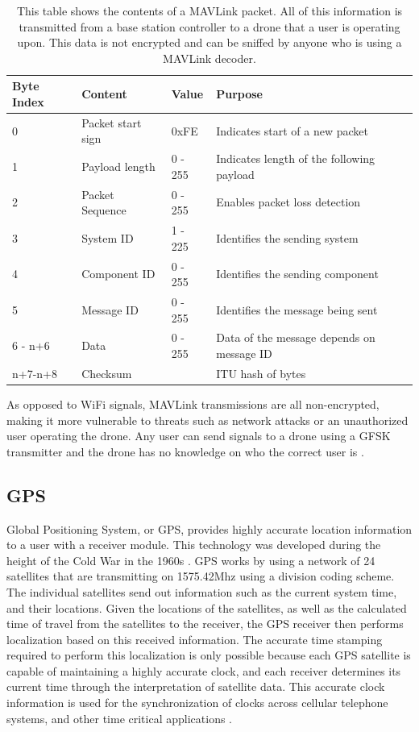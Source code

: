 \begin{table}[ht]
\centering
\caption{This table shows the contents of a MAVLink packet.  All of this information is transmitted from a base station controller to a drone that a user is operating upon.  This data is not encrypted and can be sniffed by anyone who is using a MAVLink decoder.}
\begin{tabular}{|l|l|l|p{7cm}|}
        \hline
        Byte Index & Content & Value &  Purpose \\ \hline
          0 &	Packet start sign &       0xFE &  Indicates start of a new packet\\
          1 &   Payload length &       0 - 255 &  Indicates length of the following payload \\
          2 &   Packet Sequence &      0 - 255 &  Enables packet loss detection \\
          3 &   System ID &            1 - 225 &  Identifies the sending system \\
          4 &   Component ID &         0 - 255 &  Identifies the sending component \\
          5 &	Message ID &		   0 - 255 &  Identifies the message being sent \\
          6 - n+6 &	Data & 			   0 - 255 & Data of the message depends on message ID \\
          n+7-n+8 & Checksum & & ITU hash of bytes \\
        \hline
\end{tabular}
\end{table}
\par
As opposed to WiFi signals, MAVLink transmissions are all non-encrypted, making it more vulnerable to threats such as network attacks or an unauthorized user operating the drone. Any user can send signals to a drone using a GFSK transmitter and the drone has no knowledge on who the correct user is \cite{mavlink_vuln}.

\subsection{GPS}
Global Positioning System, or GPS, provides highly accurate location information to a user with a receiver module. This technology was developed during the height of the Cold War in the 1960s \cite{gps_info}. GPS works by using a network of 24 satellites that are transmitting on 1575.42Mhz using a division coding scheme. The individual satellites send out information such as the current system time, and their locations. Given the locations of the satellites, as well as the calculated time of travel from the satellites to the receiver, the GPS receiver then performs localization based on this received information. The accurate time stamping required to perform this localization is only possible because each GPS satellite is capable of maintaining a highly accurate clock, and each receiver determines its current time through the interpretation of satellite data. This accurate clock information is used for the synchronization of clocks across cellular telephone systems, and other time critical applications \cite{GPS_Book}.

